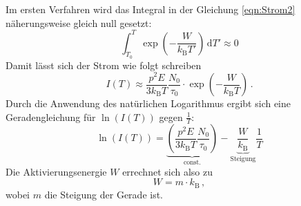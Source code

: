         \noindent Im ersten Verfahren wird das Integral in der Gleichung \eqref{eqn:Strom2} näherungsweise gleich null gesetzt:
        \begin{equation*}
            \int_{T_0}^{T} \exp\left(- \frac{W}{k_\text{B} T'}\right)\,\text{d}T' \approx 0
        \end{equation*}
        Damit lässt sich der Strom wie folgt schreiben
        \begin{equation*}
            I(T) \approx \frac{p^2E}{3 k_\text{B} T} \frac{N_0}{ \tau_0} \cdot  \exp\left(- \frac{W}{k_\text{B} T}\right) \,.
        \end{equation*}
        Durch die Anwendung des natürlichen Logarithmus ergibt sich eine Geradengleichung für $\ln\left(I(T)\right)$ gegen $\frac{1}{T}$:
        \begin{equation}
            \ln\left(I(T)\right) = \underbrace{\left(\frac{p^2E}{3 k_\text{B} T} \frac{N_0}{\tau_0}\right)}_{\text{const.}} - \underbrace{\frac{W}{k_\text{B}}}_{\text{Steigung}} \frac{1}{T}
            \label{eqn:geradengleichung}
        \end{equation}
        Die Aktivierungsenergie $W$ errechnet sich also zu 
        \begin{equation*}
            W = m \cdot k_\text{B} \, ,
        \end{equation*}
        wobei $m$ die Steigung der Gerade ist. \\

